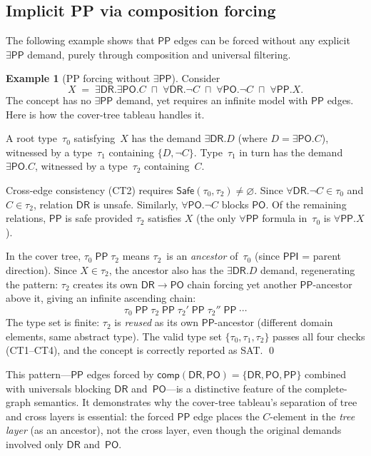 \documentclass[a4paper,11pt]{article}
\theoremstyle{definition}
\newtheorem{example}[theorem]{Example}
\newcommand{\DR}{\ensuremath{\mathsf{DR}}}
\newcommand{\PO}{\ensuremath{\mathsf{PO}}}
\newcommand{\PP}{\ensuremath{\mathsf{PP}}}
\newcommand{\PPI}{\ensuremath{\mathsf{PPI}}}
\newcommand{\comp}{\ensuremath{\mathsf{comp}}}
\newcommand{\Safe}{\ensuremath{\mathsf{Safe}}}
\begin{document}
\subsection{Implicit PP via composition forcing}
\label{sec:pp-forcing}

The following example shows that $\PP$ edges can be forced
without any explicit $\exists\PP$ demand, purely through
composition and universal filtering.

\begin{example}[PP forcing without $\exists\PP$]
\label{ex:pp-forcing}
Consider
\[
  X \;=\; \exists\DR.\exists\PO.C
    \;\sqcap\; \forall\DR.\neg C
    \;\sqcap\; \forall\PO.\neg C
    \;\sqcap\; \forall\PP.X.
\]
The concept has no $\exists\PP$ demand, yet requires an
infinite model with $\PP$ edges.  Here is how the cover-tree
tableau handles it.

A root type~$\tau_0$ satisfying~$X$ has the demand
$\exists\DR.D$ (where $D = \exists\PO.C$), witnessed by
a type~$\tau_1$ containing $\{D, \neg C\}$.
Type~$\tau_1$ in turn has the demand $\exists\PO.C$,
witnessed by a type~$\tau_2$ containing~$C$.

Cross-edge consistency (CT2) requires
$\Safe(\tau_0, \tau_2) \neq \varnothing$.
Since $\forall\DR.\neg C \in \tau_0$ and $C \in \tau_2$,
relation $\DR$ is unsafe.  Similarly, $\forall\PO.\neg C$
blocks $\PO$.  Of the remaining relations, $\PP$ is safe
provided $\tau_2$ satisfies $X$ (the only $\forall\PP$
formula in~$\tau_0$ is $\forall\PP.X$).

In the cover tree, $\tau_0 \;\PP\; \tau_2$ means
$\tau_2$~is an \emph{ancestor} of~$\tau_0$ (since $\PPI$
= parent direction).  Since $X \in \tau_2$, the ancestor
also has the $\exists\DR.D$ demand, regenerating the
pattern: $\tau_2$ creates its own $\DR \to \PO$ chain
forcing yet another $\PP$-ancestor above it, giving an
infinite ascending chain:
\[
  \tau_0 \;\PP\; \tau_2 \;\PP\; \tau_2' \;\PP\;
  \tau_2'' \;\PP\; \cdots
\]
The type set is finite: $\tau_2$ is \emph{reused} as its
own $\PP$-ancestor (different domain elements, same abstract
type).  The valid type set
$\{\tau_0, \tau_1, \tau_2\}$ passes all four checks
(CT1--CT4), and the concept is correctly reported as SAT.
\qed
\end{example}

This pattern---$\PP$ edges forced by $\comp(\DR,\PO) =
\{\DR,\PO,\PP\}$ combined with universals blocking $\DR$
and~$\PO$---is a distinctive feature of the complete-graph
semantics.  It demonstrates why the cover-tree tableau's
separation of tree and cross layers is essential: the forced
$\PP$ edge places the $C$-element in the \emph{tree layer}
(as an ancestor), not the cross layer, even though the
original demands involved only $\DR$ and~$\PO$.
\end{document}
